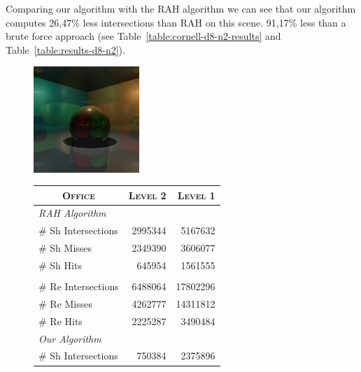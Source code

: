 
Comparing our algorithm with the RAH algorithm we can see that our algorithm computes 26,47\% less intersections than RAH on this scene. 91,17\% less than a brute force approach (see Table~\ref{table:cornell-d8-n2-results} and Table~\ref{table:results-d8-n2}).


\begin{figure}[!htb]
    \begin{minipage}{0.25\linewidth}
        \centering
        \includegraphics[width=4.0cm]{Images/Cornell_Preview}
    \end{minipage}
    \begin{minipage}{0.725\linewidth}
        \centering
        \fontsize{8}{10}
        \selectfont
        \begin{tabular}[h]{l|rr}
            \multicolumn{1}{c|}{\textsc{Office}} & \textsc{Level 2} & \textsc{Level 1}\\
            \hline
            \emph{RAH Algorithm} & & \\
            \hline
            \quad \# Sh Intersections   & 2995344   & 5167632		  \\
            \quad \# Sh Misses             & 2349390   & 3606077		  \\
            \quad \# Sh Hits               & 645954    & 1561555		  \\
            & & \\
            \quad \# Re Intersections   & 6488064   & 17802296		  \\
            \quad \# Re Misses             & 4262777   & 14311812		  \\
            \quad \# Re Hits               & 2225287   & 3490484		  \\
            \hline
            \emph{Our Algorithm} & & \\
            \hline
            \quad \# Sh Intersections   & 750384    & 2375896		  \\

\end{tabular}
\end{minipage}
\end{figure}
